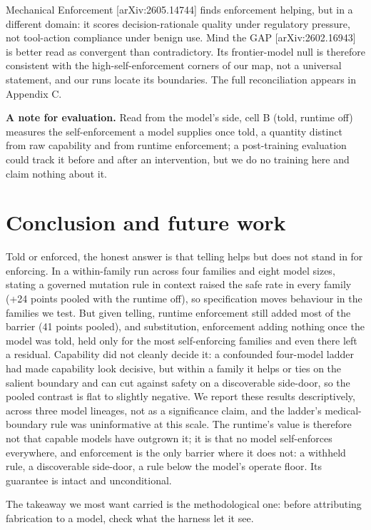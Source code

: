 \documentclass{article}
\begin{document}
Mechanical Enforcement {[}arXiv:2605.14744{]} finds enforcement helping, but in a different domain: it scores decision-rationale quality under regulatory pressure, not tool-action compliance under benign use. Mind the GAP {[}arXiv:2602.16943{]} is better read as convergent than contradictory. Its frontier-model null is therefore consistent with the high-self-enforcement corners of our map, not a universal statement, and our runs locate its boundaries. The full reconciliation appears in Appendix C.

\textbf{A note for evaluation.} Read from the model's side, cell B (told, runtime off) measures the self-enforcement a model supplies once told, a quantity distinct from raw capability and from runtime enforcement; a post-training evaluation could track it before and after an intervention, but we do no training here and claim nothing about it.

\section{Conclusion and future work}\label{conclusion-and-future-work}

 Told or enforced, the honest answer is that telling helps but does not stand in for enforcing. In a within-family run across four families and eight model sizes, stating a governed mutation rule in context raised the safe rate in every family (+24 points pooled with the runtime off), so specification moves behaviour in the families we test. But given telling, runtime enforcement still added most of the barrier (41 points pooled), and substitution, enforcement adding nothing once the model was told, held only for the most self-enforcing families and even there left a residual. Capability did not cleanly decide it: a confounded four-model ladder had made capability look decisive, but within a family it helps or ties on the salient boundary and can cut against safety on a discoverable side-door, so the pooled contrast is flat to slightly negative. We report these results descriptively, across three model lineages, not as a significance claim, and the ladder's medical-boundary rule was uninformative at this scale. The runtime's value is therefore not that capable models have outgrown it; it is that no model self-enforces everywhere, and enforcement is the only barrier where it does not: a withheld rule, a discoverable side-door, a rule below the model's operate floor. Its guarantee is intact and unconditional.

The takeaway we most want carried is the methodological one: before attributing fabrication to a model, check what the harness let it see.
\end{document}
